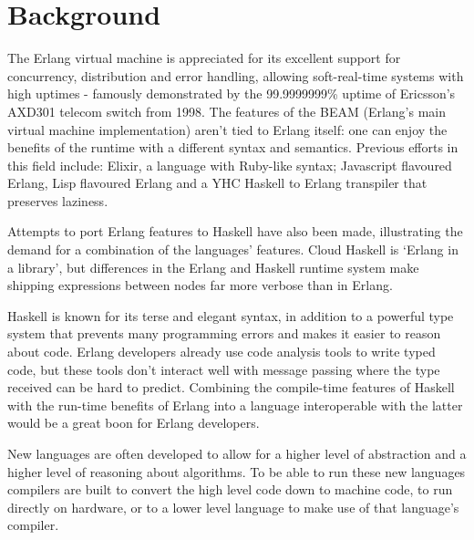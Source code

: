 \chapter{Background}



The Erlang virtual machine is appreciated for its excellent support for
concurrency, distribution and error handling, allowing soft-real-time systems
with high uptimes - famously demonstrated by the 99.9999999\% uptime of
Ericsson’s AXD301 telecom switch from 1998. The features of the BEAM (Erlang’s
main virtual machine implementation) aren't tied to Erlang itself: one can
enjoy the benefits of the runtime with a different syntax and semantics.
Previous efforts in this field include: Elixir, a language with Ruby-like
syntax; Javascript flavoured Erlang, Lisp flavoured Erlang and a YHC Haskell
to Erlang transpiler that preserves laziness.

Attempts to port Erlang features to Haskell have also been made, illustrating
the demand for a combination of the languages’ features. Cloud Haskell is
‘Erlang in a library’, but differences in the Erlang and Haskell runtime
system make shipping expressions between nodes far more verbose than in Erlang.

Haskell is known for its terse and elegant syntax, in addition to a powerful
type system that prevents many programming errors and makes it easier to
reason about code. Erlang developers already use code analysis tools to write
typed code, but these tools don’t interact well with message passing where the type received can be hard to predict. Combining the compile-time features of Haskell with the run-time benefits of Erlang into a language interoperable with the latter would be a great boon for Erlang developers.


New languages are often developed to allow for a higher level of abstraction and a higher level of reasoning about algorithms. To be able to run these new languages compilers are built to convert the high level code down to machine code, to run directly on hardware, or to a lower level language to make use of that language's compiler. 


